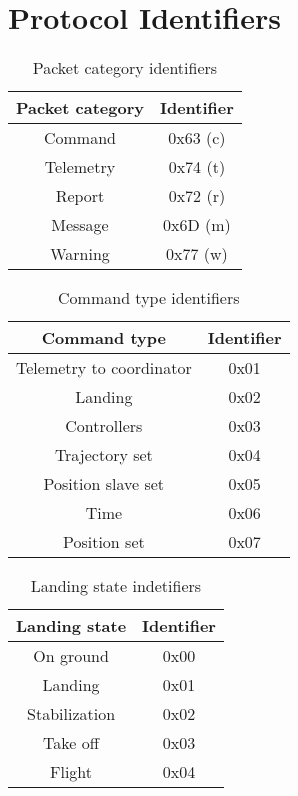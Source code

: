 \section{Protocol Identifiers}

\begin{table}[h]
\begin{center}
 \begin{tabular}{c c } 
\toprule
\rowcolor[HTML]{FFFC9E} 
\textbf{ Packet category} & \textbf{Identifier} 
\\ \midrule
 Command & 0x63 (c)\\  [1ex] 

 Telemetry & 0x74 (t)\\ [1ex] 

 Report & 0x72 (r)   \\ [1ex] 

 Message & 0x6D (m)\\ [1ex] 

 Warning & 0x77 (w) \\  [1ex]  
 \bottomrule  
\end{tabular}
\end{center}
\caption{Packet category identifiers}
\label{tab:packetCategoryIdentifiers}
\end{table}

\begin{table}[h]
\begin{center}
 \begin{tabular}{c c } 
\toprule
\rowcolor[HTML]{FFFC9E} 
\textbf{ Command type } & \textbf{Identifier} 
\\ \midrule
 Telemetry to coordinator & 0x01 \\ [1ex]
 Landing & 0x02\\[1ex]
 Controllers & 0x03  \\[1ex]
 Trajectory set & 0x04  \\[1ex]
 Position slave set & 0x05  \\ [1ex]
 Time & 0x06\\[1ex]
 Position set & 0x07  \\ [1ex]
 \bottomrule 
\end{tabular}
\end{center}
\caption{Command type identifiers}
\label{tab:commandTypesIdentifiers}
\end{table}

\begin{table}[h]
\begin{center}
 \begin{tabular}{c c} 
\toprule
\rowcolor[HTML]{FFFC9E} 
 \textbf{Landing state} & \textbf{Identifier}
\\ \midrule
 On ground  &0x00 \\  [1ex] 
  Landing  &0x01 \\  [1ex] 
  Stabilization  &0x02 \\  [1ex] 
  Take off  &0x03 \\  [1ex] 
  Flight  &0x04 \\  [1ex] 
 \bottomrule
\end{tabular}
\end{center}
\caption{Landing state indetifiers}
\label{tab:landingStatesIdentifiers}
\end{table}

